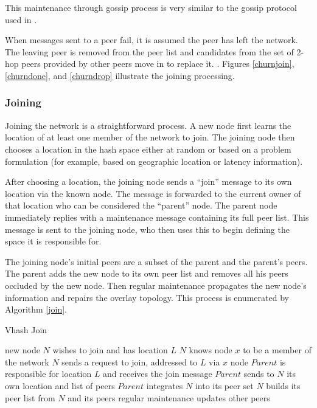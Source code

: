 \documentclass{IEEEtran}
\begin{document}
This maintenance through gossip process is very similar to the gossip protocol used in \cite{raynet}.  

When messages sent to a peer fail, it is assumed the peer has left the network. The leaving peer is removed from the peer list and candidates from the set of 2-hop peers provided by other peers move in to replace it. .  Figures \ref{churnjoin}, \ref{churndone}, and \ref{churndrop} illustrate the joining processing.



\subsubsection*{Joining}
Joining the network is a straightforward process. A new node first learns the location of at least one member of the network to join. The joining node then chooses a location in the hash space either at random or based on a problem formulation (for example, based on geographic location or latency information).

After choosing a location, the joining node sends a ``join'' message to its own location via the known node.
The message is forwarded to the current owner of that location who can be considered the ``parent'' node.
The parent node immediately replies with a maintenance message containing its full peer list. This message is sent to the joining node, who then uses this to begin defining the space it is responsible for. 

The joining node's initial peers are a subset of the parent and the parent's peers. The parent adds the new node to its own peer list and removes all his peers occluded by the new node.  Then regular maintenance propagates the new node's information and repairs the overlay topology.  This process is enumerated by Algorithm \ref{join}.


\begin{algorithm}
\caption{Vhash Join}
\label{join}
\begin{algorithmic}[1]  %
\STATE new node $N$ wishes to join and has location $L$
\STATE $N$ knows node $x$ to be a member of the network
\STATE $N$ sends a request to join, addressed to $L$ via $x$
\STATE node $Parent$ is responsible for location $L$ and receives the join message
\STATE $Parent$ sends to $N$ its own location and list of peers
\STATE $Parent$ integrates $N$ into its peer set
\STATE $N$ builds its peer list from $N$ and its peers
\STATE regular maintenance updates other peers
\end{algorithmic}
\end{algorithm}
\end{document}
